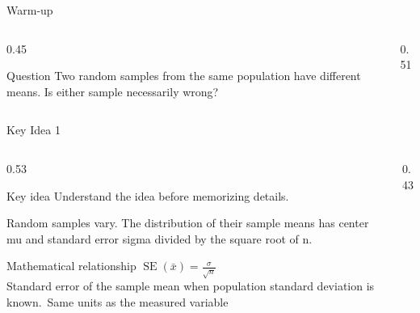 \documentclass[aspectratio=169]{beamer}
\begin{document}
\begin{frame}{Warm-up}
\begin{columns}[T]
\begin{column}{0.45\textwidth}
\begin{block}{Question}
\small Two random samples from the same population have different means. Is either sample necessarily wrong?
\end{block}
\end{column}
\begin{column}{0.51\textwidth}
\begin{center}\end{center}
\end{column}
\end{columns}

\end{frame}

\begin{frame}{Key Idea 1}
\begin{columns}[T]
\begin{column}{0.53\textwidth}
\begin{alertblock}{Key idea}
\small Understand the idea before memorizing details.
\end{alertblock}

\small Random samples vary. The distribution of their sample means has center mu and standard error sigma divided by the square root of n.

\begin{block}{Mathematical relationship}
\centering\Large $\operatorname{SE}(\bar{x})=\frac{\sigma}{\sqrt{n}}$\\[0.12cm]
\small Standard error of the sample mean when population standard deviation is known.\ Same units as the measured variable
\end{block}
\end{column}
\begin{column}{0.43\textwidth}
\begin{center}\end{center}
\end{column}
\end{columns}

\end{frame}
\end{document}
